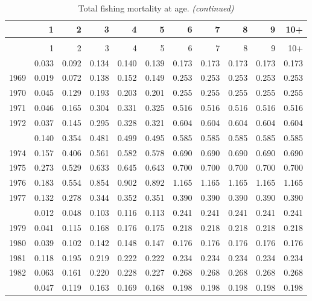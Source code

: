 \documentclass[
]{article}
\begin{document}
\begin{longtable}[t]{lrrrrrrrrrr}
\caption{\label{tab:FAA-tot-table}Total fishing mortality at age.}\\
\toprule
  & 1 & 2 & 3 & 4 & 5 & 6 & 7 & 8 & 9 & 10+\\
\midrule
\endfirsthead
\caption[]{Total fishing mortality at age. \textit{(continued)}}\\
\toprule
  & 1 & 2 & 3 & 4 & 5 & 6 & 7 & 8 & 9 & 10+\\
\midrule
\endhead

\endfoot
\bottomrule
\endlastfoot
1968 & 0.033 & 0.092 & 0.134 & 0.140 & 0.139 & 0.173 & 0.173 & 0.173 & 0.173 & 0.173\\
1969 & 0.019 & 0.072 & 0.138 & 0.152 & 0.149 & 0.253 & 0.253 & 0.253 & 0.253 & 0.253\\
1970 & 0.045 & 0.129 & 0.193 & 0.203 & 0.201 & 0.255 & 0.255 & 0.255 & 0.255 & 0.255\\
1971 & 0.046 & 0.165 & 0.304 & 0.331 & 0.325 & 0.516 & 0.516 & 0.516 & 0.516 & 0.516\\
1972 & 0.037 & 0.145 & 0.295 & 0.328 & 0.321 & 0.604 & 0.604 & 0.604 & 0.604 & 0.604\\
\addlinespace
1973 & 0.140 & 0.354 & 0.481 & 0.499 & 0.495 & 0.585 & 0.585 & 0.585 & 0.585 & 0.585\\
1974 & 0.157 & 0.406 & 0.561 & 0.582 & 0.578 & 0.690 & 0.690 & 0.690 & 0.690 & 0.690\\
1975 & 0.273 & 0.529 & 0.633 & 0.645 & 0.643 & 0.700 & 0.700 & 0.700 & 0.700 & 0.700\\
1976 & 0.183 & 0.554 & 0.854 & 0.902 & 0.892 & 1.165 & 1.165 & 1.165 & 1.165 & 1.165\\
1977 & 0.132 & 0.278 & 0.344 & 0.352 & 0.351 & 0.390 & 0.390 & 0.390 & 0.390 & 0.390\\
\addlinespace
1978 & 0.012 & 0.048 & 0.103 & 0.116 & 0.113 & 0.241 & 0.241 & 0.241 & 0.241 & 0.241\\
1979 & 0.041 & 0.115 & 0.168 & 0.176 & 0.175 & 0.218 & 0.218 & 0.218 & 0.218 & 0.218\\
1980 & 0.039 & 0.102 & 0.142 & 0.148 & 0.147 & 0.176 & 0.176 & 0.176 & 0.176 & 0.176\\
1981 & 0.118 & 0.195 & 0.219 & 0.222 & 0.222 & 0.234 & 0.234 & 0.234 & 0.234 & 0.234\\
1982 & 0.063 & 0.161 & 0.220 & 0.228 & 0.227 & 0.268 & 0.268 & 0.268 & 0.268 & 0.268\\
\addlinespace
1983 & 0.047 & 0.119 & 0.163 & 0.169 & 0.168 & 0.198 & 0.198 & 0.198 & 0.198 & 0.198\\

\end{longtable}
\end{document}
